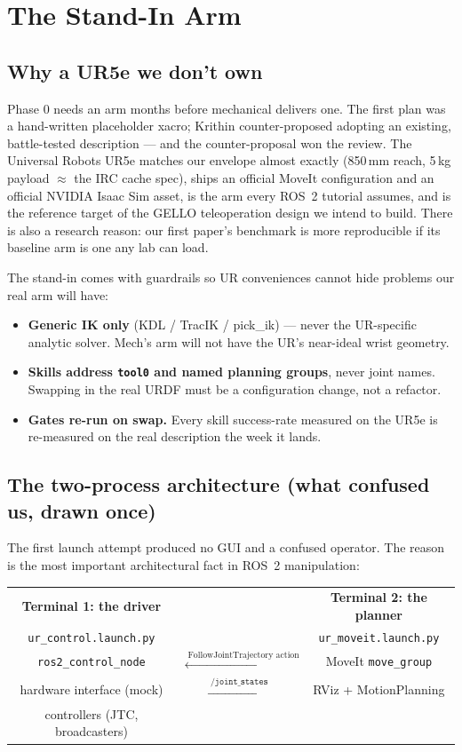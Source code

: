 \chapter{The Stand-In Arm}
\label{ch:standin}

\section{Why a UR5e we don't own}

Phase 0 needs an arm months before mechanical delivers one. The first plan was a hand-written
placeholder xacro; Krithin counter-proposed adopting an existing, battle-tested description ---
and the counter-proposal won the review. The Universal Robots UR5e matches our envelope almost
exactly (850\,mm reach, 5\,kg payload $\approx$ the IRC cache spec), ships an official MoveIt
configuration and an official NVIDIA Isaac Sim asset, is the arm every ROS~2 tutorial assumes,
and is the reference target of the GELLO teleoperation design we intend to build. There is also
a research reason: our first paper's benchmark is more reproducible if its baseline arm is one
any lab can load.

The stand-in comes with guardrails so UR conveniences cannot hide problems our real arm will
have:
\begin{itemize}
  \item \textbf{Generic IK only} (KDL / TracIK / pick\_ik) --- never the UR-specific analytic
  solver. Mech's arm will not have the UR's near-ideal wrist geometry.
  \item \textbf{Skills address \texttt{tool0} and named planning groups}, never joint names.
  Swapping in the real URDF must be a configuration change, not a refactor.
  \item \textbf{Gates re-run on swap.} Every skill success-rate measured on the UR5e is
  re-measured on the real description the week it lands.
\end{itemize}

\section{The two-process architecture (what confused us, drawn once)}
\label{sec:two-process}

The first launch attempt produced no GUI and a confused operator. The reason is the most
important architectural fact in ROS~2 manipulation:

\begin{center}
\begin{tabular}{ccc}
\textbf{Terminal 1: the driver} & & \textbf{Terminal 2: the planner} \\
\texttt{ur\_control.launch.py} & & \texttt{ur\_moveit.launch.py} \\
\hline
\texttt{ros2\_control\_node} & $\xleftarrow{\;\text{FollowJointTrajectory action}\;}$ &
MoveIt \texttt{move\_group} \\
hardware interface (mock) & $\xrightarrow{\;\texttt{/joint\_states}\;}$ & RViz + MotionPlanning \\
controllers (JTC, broadcasters) & &
\end{tabular}
\end{center}

